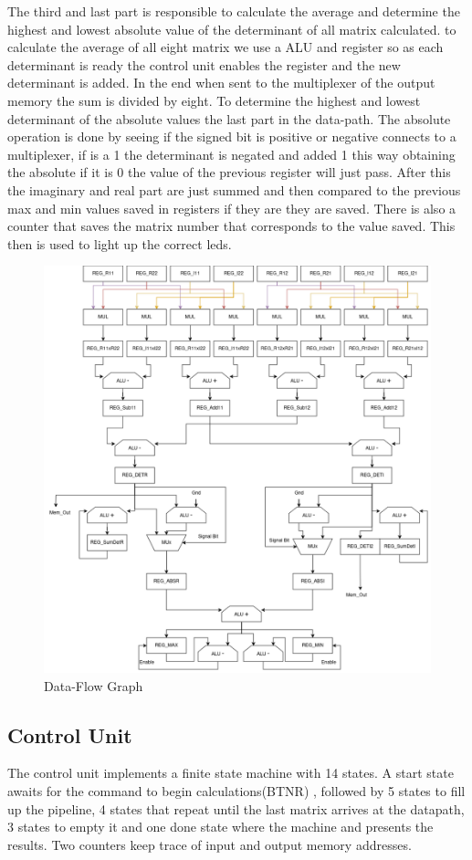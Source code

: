 \documentclass[12pt]{article}
\begin{document}
The third and last part is responsible to calculate the average and determine the highest and lowest absolute value of the determinant of all matrix calculated. to calculate the average of all eight matrix we use a ALU and register so as each determinant is ready the control unit enables the register and the new determinant is added. In the end when sent to the multiplexer of the output memory the sum is divided by eight. To determine the highest and lowest determinant of the absolute values the last part in the data-path. The absolute operation is done by seeing if the signed bit is positive or negative connects to a multiplexer, if is a 1 the determinant is negated and added 1 this way obtaining the absolute if it is 0 the value of the previous register will just pass. After this the imaginary and real part are just summed and then compared to the previous max and min values saved in registers if they are they are saved. There is also a counter that saves the matrix number that corresponds to the value saved. This then is used to light up the correct leds. 
\begin{figure}[H]
	\centering
	\includegraphics[width=0.75\linewidth]{images/DataPath.png}
	\caption{Data-Flow Graph}
	\label{fig:datapath}
\end{figure}


\subsection{Control Unit}
The control unit implements a finite state machine with 14 states. A start state awaits for the command to begin calculations(BTNR) , followed by 5 states to fill up the pipeline, 4 states that repeat until the last matrix arrives at the datapath, 3 states to empty it and one done state where the machine and presents the results.
Two counters keep trace of input and output memory addresses.
\end{document}
